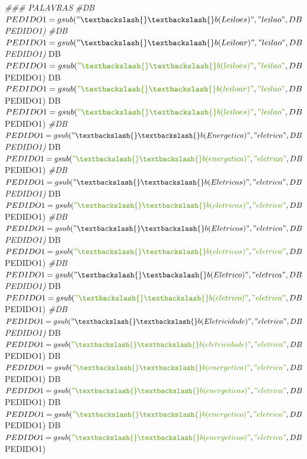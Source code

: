 \documentclass[]{article}
\newenvironment{Shaded}{\begin{snugshade}}{\end{snugshade}}
\newcommand{\CommentTok}[1]{\textcolor[rgb]{0.56,0.35,0.01}{\textit{#1}}}
\newcommand{\NormalTok}[1]{#1}
\newcommand{\StringTok}[1]{\textcolor[rgb]{0.31,0.60,0.02}{#1}}
\begin{document}
\begin{Shaded}
\begin{Highlighting}[]
\CommentTok{### PALAVRAS}
\CommentTok{#DB$PEDIDO1 =gsub("\textbackslash{}\textbackslash{}b(Leiloes)", "leilao", DB$PEDIDO1)}
\CommentTok{#DB$PEDIDO1 =gsub("\textbackslash{}\textbackslash{}b(Leiloar)", "leilao", DB$PEDIDO1)}
\NormalTok{DB$PEDIDO1 =gsub(}\StringTok{"\textbackslash{}\textbackslash{}b(leiloes)"}\NormalTok{, }\StringTok{"leilao"}\NormalTok{, DB$PEDIDO1)}
\NormalTok{DB$PEDIDO1 =gsub(}\StringTok{"\textbackslash{}\textbackslash{}b(leiloar)"}\NormalTok{, }\StringTok{"leilao"}\NormalTok{, DB$PEDIDO1)}
\NormalTok{DB$PEDIDO1 =gsub(}\StringTok{"\textbackslash{}\textbackslash{}b(leiloes)"}\NormalTok{, }\StringTok{"leilao"}\NormalTok{, DB$PEDIDO1)}
\CommentTok{#DB$PEDIDO1 =gsub("\textbackslash{}\textbackslash{}b(Energetica)", "eletrica", DB$PEDIDO1)}
\NormalTok{DB$PEDIDO1 =gsub(}\StringTok{"\textbackslash{}\textbackslash{}b(energetica)"}\NormalTok{, }\StringTok{"eletrica"}\NormalTok{, DB$PEDIDO1)}
\CommentTok{#DB$PEDIDO1 =gsub("\textbackslash{}\textbackslash{}b(Eletricas)", "eletrica", DB$PEDIDO1)}
\NormalTok{DB$PEDIDO1 =gsub(}\StringTok{"\textbackslash{}\textbackslash{}b(eletricas)"}\NormalTok{, }\StringTok{"eletrica"}\NormalTok{, DB$PEDIDO1)}
\CommentTok{#DB$PEDIDO1 =gsub("\textbackslash{}\textbackslash{}b(Eletricos)", "eletrica", DB$PEDIDO1)}
\NormalTok{DB$PEDIDO1 =gsub(}\StringTok{"\textbackslash{}\textbackslash{}b(eletricos)"}\NormalTok{, }\StringTok{"eletrica"}\NormalTok{, DB$PEDIDO1)}
\CommentTok{#DB$PEDIDO1 =gsub("\textbackslash{}\textbackslash{}b(Eletrico)", "eletrica", DB$PEDIDO1)}
\NormalTok{DB$PEDIDO1 =gsub(}\StringTok{"\textbackslash{}\textbackslash{}b(eletrico)"}\NormalTok{, }\StringTok{"eletrica"}\NormalTok{, DB$PEDIDO1)}
\CommentTok{#DB$PEDIDO1 =gsub("\textbackslash{}\textbackslash{}b(Eletricidade)", "eletrica", DB$PEDIDO1)}
\NormalTok{DB$PEDIDO1 =gsub(}\StringTok{"\textbackslash{}\textbackslash{}b(eletricidade)"}\NormalTok{, }\StringTok{"eletrica"}\NormalTok{, DB$PEDIDO1)}
\NormalTok{DB$PEDIDO1 =gsub(}\StringTok{"\textbackslash{}\textbackslash{}b(energetica)"}\NormalTok{, }\StringTok{"eletrica"}\NormalTok{, DB$PEDIDO1)}
\NormalTok{DB$PEDIDO1 =gsub(}\StringTok{"\textbackslash{}\textbackslash{}b(energeticas)"}\NormalTok{, }\StringTok{"eletrica"}\NormalTok{, DB$PEDIDO1)}
\NormalTok{DB$PEDIDO1 =gsub(}\StringTok{"\textbackslash{}\textbackslash{}b(energetico)"}\NormalTok{, }\StringTok{"eletrica"}\NormalTok{, DB$PEDIDO1)}
\NormalTok{DB$PEDIDO1 =gsub(}\StringTok{"\textbackslash{}\textbackslash{}b(energeticos)"}\NormalTok{, }\StringTok{"eletrica"}\NormalTok{, DB$PEDIDO1)}

\end{Highlighting}
\end{Shaded}
\end{document}
